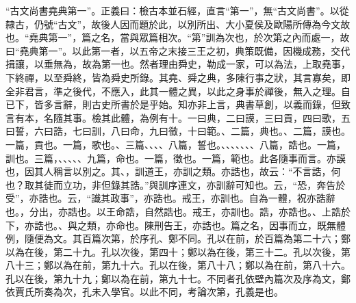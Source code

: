  {\noindent\shu{}\fzkt “古文尚書堯典第一”。正義曰：檢古本並石經，直言“第一”，無“古文尚書”。以從隸古，仍號“古文”，故後人因而題於此，以別所出、大小夏侯及歐陽所傳為今文故也。“堯典第一”，篇之名，當與眾篇相次。“第”訓為次也，於次第之內而處一，故曰“堯典第一”。以此第一者，以五帝之末接三王之初，典策既備，因機成務，交代揖讓，以垂無為，故為第一也。然者理由舜史，勒成一家，可以為法，上取堯事，下終禪，以至舜終，皆為舜史所錄。其堯、舜之典，多陳行事之狀，其言寡矣，即全非君言，準之後代，不應入，此其一體之異，以此之身事於禪後，無入之理。自已下，皆多言辭，則古史所書於是乎始。知亦非上言，典書草創，以義而錄，但致言有本，名隨其事。檢其此體，為例有十。一曰典，二曰謨，三曰貢，四曰歌，五曰誓，六曰誥，七曰訓，八曰命，九曰徵，十曰範。、二篇，典也。、二篇，謨也。一篇，貢也。一篇，歌也。、三篇、、、、八篇，誓也。、、、、、、、八篇，誥也。一篇，訓也。三篇，、、、、、九篇，命也。一篇，徵也。一篇，範也。此各隨事而言。亦謨也，因其人稱言以別之。其、，訓道王，亦訓之類。亦誥也，故云：“不言誥，何也？取其徒而立功，非但錄其誥。”與訓序連文，亦訓辭可知也。云，“恐，奔告於受”，亦誥也。云，“識其政事”，亦誥也。戒王，亦訓也。自為一體，祝亦誥辭也。，分出，亦誥也。以王命誥，自然誥也。戒王，亦訓也。誥，亦誥也。、上誥於下，亦誥也。、與之類，亦命也。陳刑告王，亦誥也。篇之名，因事而立，既無體例，隨便為文。其百篇次第，於序孔、鄭不同。孔以在前，於百篇為第二十六；鄭以為在後，第二十九。孔以次後，第四十；鄭以為在後，第三十二。孔以次後，第八十三；鄭以為在前，第九十六。孔以在後，第八十八；鄭以為在前，第八十六。孔以在後，第九十九；鄭以為在前，第九十七。不同者孔依壁內篇次及序為文，鄭依賈氏所奏為次，孔未入學官。以此不同，考論次第，孔義是也。 \par}

